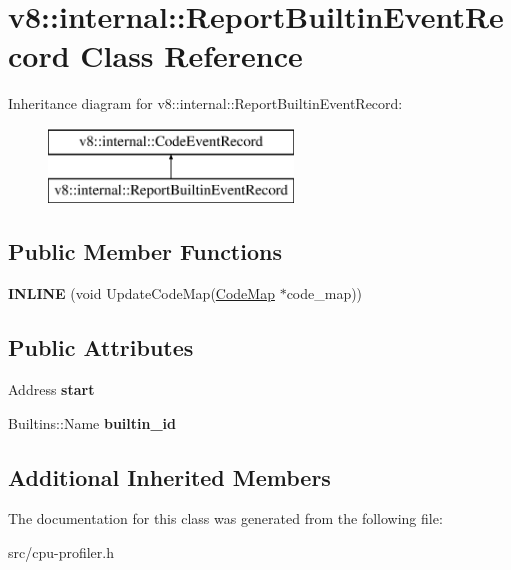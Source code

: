 \hypertarget{classv8_1_1internal_1_1_report_builtin_event_record}{}\section{v8\+:\+:internal\+:\+:Report\+Builtin\+Event\+Record Class Reference}
\label{classv8_1_1internal_1_1_report_builtin_event_record}
Inheritance diagram for v8\+:\+:internal\+:\+:Report\+Builtin\+Event\+Record\+:\begin{figure}[H]
\begin{center}
\leavevmode
\includegraphics[height=2.000000cm]{classv8_1_1internal_1_1_report_builtin_event_record}
\end{center}
\end{figure}
\subsection*{Public Member Functions}
\begin{DoxyCompactItemize}
\item 
\hypertarget{classv8_1_1internal_1_1_report_builtin_event_record_a426b35c985d678fdf1abeb7bc677bed3}{}{\bfseries I\+N\+L\+I\+N\+E} (void Update\+Code\+Map(\hyperlink{classv8_1_1internal_1_1_code_map}{Code\+Map} $\ast$code\+\_\+map))\label{classv8_1_1internal_1_1_report_builtin_event_record_a426b35c985d678fdf1abeb7bc677bed3}

\end{DoxyCompactItemize}
\subsection*{Public Attributes}
\begin{DoxyCompactItemize}
\item 
\hypertarget{classv8_1_1internal_1_1_report_builtin_event_record_ac7ebe4048f88a1e0a433213494754555}{}Address {\bfseries start}\label{classv8_1_1internal_1_1_report_builtin_event_record_ac7ebe4048f88a1e0a433213494754555}

\item 
\hypertarget{classv8_1_1internal_1_1_report_builtin_event_record_ab06c795d55d0154ee34481488999df31}{}Builtins\+::\+Name {\bfseries builtin\+\_\+id}\label{classv8_1_1internal_1_1_report_builtin_event_record_ab06c795d55d0154ee34481488999df31}

\end{DoxyCompactItemize}
\subsection*{Additional Inherited Members}


The documentation for this class was generated from the following file\+:\begin{DoxyCompactItemize}
\item 
src/cpu-\/profiler.\+h\end{DoxyCompactItemize}
